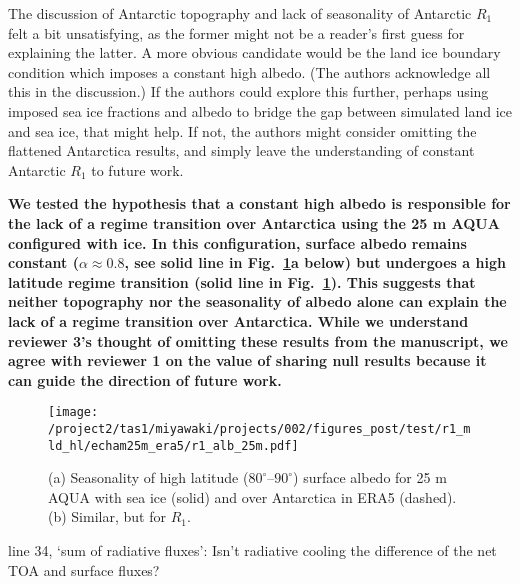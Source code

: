 \documentclass{article}
\begin{document}
The discussion of Antarctic topography and lack of seasonality of Antarctic $R_1$ felt a bit unsatisfying, as the former might not be a reader's first guess for explaining the latter. A more obvious candidate would be the land ice boundary condition which imposes a constant high albedo. (The authors acknowledge all this in the discussion.) If the authors could explore this further, perhaps using imposed sea ice fractions and albedo to bridge the gap between simulated land ice and sea ice, that might help. If not, the authors might consider omitting the flattened Antarctica results, and simply leave the understanding of constant Antarctic $R_1$ to future work.

\textbf{We tested the hypothesis that a constant high albedo is responsible for the lack of a regime transition over Antarctica using the 25 m AQUA configured with ice. In this configuration, surface albedo remains constant ($\alpha\approx0.8$, see solid line in Fig.~\ref{fig:echam-alb-ice}a below) but undergoes a high latitude regime transition (solid line in Fig.~\ref{fig:echam-alb-ice}). This suggests that neither topography nor the seasonality of albedo alone can explain the lack of a regime transition over Antarctica. While we understand reviewer 3's thought of omitting these results from the manuscript, we agree with reviewer 1 on the value of sharing null results because it can guide the direction of future work.}

\begin{figure}[!h]
    \centering
    \noindent\texttt{[image: /project2/tas1/miyawaki/projects/002/figures\_post/test/r1\_mld\_hl/echam25m\_era5/r1\_alb\_25m.pdf]}
    \caption{(a) Seasonality of high latitude ($80^\circ$--$90^\circ$) surface albedo for 25 m AQUA with sea ice (solid) and over Antarctica in ERA5 (dashed). (b) Similar, but for $R_1$.}
    \label{fig:echam-alb-ice}
\end{figure}

line 34, `sum of radiative fluxes': Isn't radiative cooling the difference of the net TOA and surface fluxes?
\end{document}

